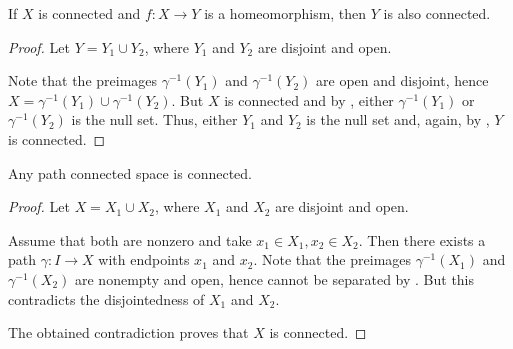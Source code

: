\begin{proposition}\label{thm:homomorphism_preserves_connectedness}
  If \( X \) is connected and \( f: X \to Y \) is a homeomorphism, then \( Y \) is also connected.
\end{proposition}
\begin{proof}
  Let \( Y = Y_1 \cup Y_2 \), where \( Y_1 \) and \( Y_2 \) are disjoint and open.

  Note that the preimages \( \gamma^{-1}(Y_1) \) and \( \gamma^{-1}(Y_2) \) are open and disjoint, hence \( X = \gamma^{-1}(Y_1) \cup \gamma^{-1}(Y_2) \). But \( X \) is connected and by , either \( \gamma^{-1}(Y_1) \) or \( \gamma^{-1}(Y_2) \) is the null set. Thus, either \( Y_1 \) and \( Y_2 \) is the null set and, again, by , \( Y \) is connected.
\end{proof}

\begin{proposition}\label{thm:path_connected_implies_connected}
  Any path connected space is connected.
\end{proposition}
\begin{proof}
  Let \( X = X_1 \cup X_2 \), where \( X_1 \) and \( X_2 \) are disjoint and open.

  Assume that both are nonzero and take \( x_1 \in X_1, x_2 \in X_2 \). Then there exists a path \( \gamma: I \to X \) with endpoints \( x_1 \) and \( x_2 \). Note that the preimages \( \gamma^{-1}(X_1) \) and \( \gamma^{-1}(X_2) \) are nonempty and open, hence cannot be separated by . But this contradicts the disjointedness of \( X_1 \) and \( X_2 \).

  The obtained contradiction proves that \( X \) is connected.
\end{proof}
